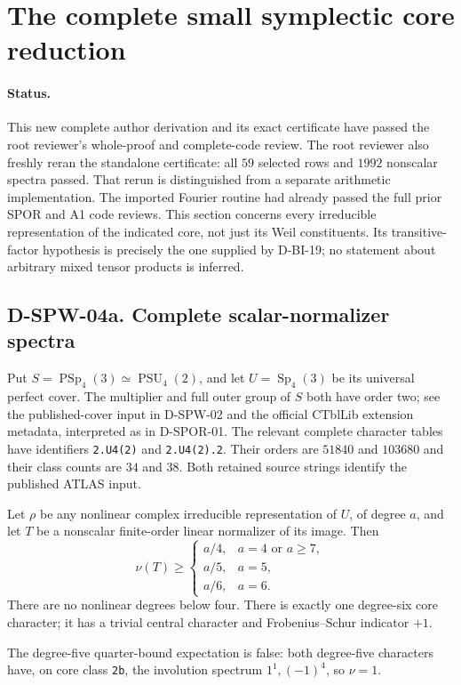 \section{The complete small symplectic core reduction}
\label{sec:sp43-core}

\paragraph{Status.}
This new complete author derivation and its exact certificate have
passed the root reviewer's whole-proof and complete-code review.
The root reviewer also freshly reran the standalone certificate:
all $59$ selected rows and $1992$ nonscalar spectra passed.
That rerun is distinguished from a separate arithmetic implementation.
The imported Fourier routine had already passed the full prior
SPOR and A1 code reviews.  This section concerns every
irreducible representation of the indicated core, not just its Weil
constituents.  Its transitive-factor hypothesis is precisely the
one supplied by D-BI-19; no statement about arbitrary mixed
tensor products is inferred.

\subsection*{D-SPW-04a. Complete scalar-normalizer spectra}

Put $S=\operatorname{PSp}_4(3)\simeq\operatorname{PSU}_4(2)$,
and let $U=\operatorname{Sp}_4(3)$ be its universal perfect cover.
The multiplier and full outer group of $S$ both have order two;
see the published-cover input in D-SPW-02 and the official
CTblLib extension metadata, interpreted as in D-SPOR-01.
The relevant complete character tables have identifiers
\texttt{2.U4(2)} and \texttt{2.U4(2).2}.  Their orders are
$51840$ and $103680$ and their class counts are $34$ and $38$.
Both retained source strings identify the published ATLAS input.

\begin{lemma}
\label{D-SPW-04a}
Let $\rho$ be any nonlinear complex irreducible representation
of $U$, of degree $a$, and let $T$ be a nonscalar finite-order
linear normalizer of its image.  Then
\[
 \nu(T)\ge
 \begin{cases}
 a/4,&a=4\text{ or }a\ge7,\\
 a/5,&a=5,\\
 a/6,&a=6.
 \end{cases}                                               \tag{SPW.12}
\]
There are no nonlinear degrees below four.  There is exactly
one degree-six core character; it has a trivial central
character and Frobenius--Schur indicator $+1$.

The degree-five quarter-bound expectation is false: both
degree-five characters have, on core class \texttt{2b}, the
involution spectrum $1^1,(-1)^4$, so $\nu=1$.
\end{lemma}

